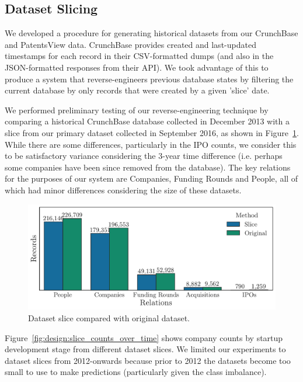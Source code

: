 \documentclass[../thesis/thesis.tex]{subfiles}
\begin{document}
\subsection{Dataset Slicing}

We developed a procedure for generating historical datasets from our CrunchBase and PatentsView data. CrunchBase provides created and last-updated timestamps for each record in their CSV-formatted dumps (and also in the JSON-formatted responses from their API). We took advantage of this to produce a system that reverse-engineers previous database states by filtering the current database by only records that were created by a given 'slice' date.

We performed preliminary testing of our reverse-engineering technique by comparing a historical CrunchBase database collected in December 2013 with a slice from our primary dataset collected in September 2016, as shown in Figure~\ref{fig:design:2013_slice_comparison}. While there are some differences, particularly in the IPO counts, we consider this to be satisfactory variance considering the 3-year time difference (i.e. perhaps some companies have been since removed from the database). The key relations for the purposes of our system are Companies, Funding Rounds and People, all of which had minor differences considering the size of these datasets.

\begin{figure}[!htb]
    \centering
    \includegraphics[width=\textwidth]{../figures/design/2013_slice_comparison}
    \caption[Dataset slice compared with original database]{Dataset slice compared with original dataset.}
    \label{fig:design:2013_slice_comparison}
\end{figure}

Figure~\ref{fig:design:slice_counts_over_time} shows company counts by startup development stage from different dataset slices. We limited our experiments to dataset slices from 2012-onwards because prior to 2012 the datasets become too small to use to make predictions (particularly given the class imbalance).
\end{document}
